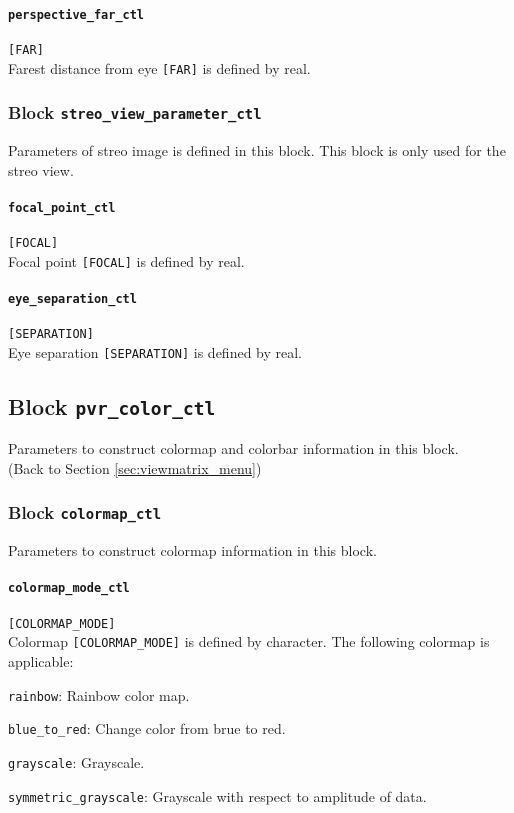 \paragraph{\tt perspective\_far\_ctl}
\label{href_t:perspective_far_ctl}
\verb|[FAR]| \\
Farest distance from eye \verb|[FAR]| is defined by real.


\subsubsection{Block {\tt streo\_view\_parameter\_ctl}}
\label{href_t:streo_view_parameter_ctl}
Parameters of streo image is defined in this block. This block is only used for the streo view.

\paragraph{\tt focal\_point\_ctl}
\label{href_t:focal_point_ctl}
\verb|[FOCAL]| \\
Focal point \verb|[FOCAL]| is defined by real.

\paragraph{\tt eye\_separation\_ctl}
\label{href_t:eye_separation_ctl}
\verb|[SEPARATION]| \\
Eye separation \verb|[SEPARATION]| is defined by real.



\subsection{Block {\tt pvr\_color\_ctl}}
\label{href_t:pvr_color_ctl}
Parameters to construct colormap and colorbar information in this block. \\
(Back to Section \ref{sec:viewmatrix_menu}) \\

\subsubsection{Block {\tt colormap\_ctl}}
\label{href_t:colormap_ctl}
Parameters to construct colormap information in this block. \\

\paragraph{\tt colormap\_mode\_ctl}
\label{href_t:colormap_mode_ctl}
\verb|[COLORMAP_MODE]| \\
Colormap \verb|[COLORMAP_MODE]| is defined by character. The following colormap is applicable:
\begin{description}
\item{{\tt rainbow}: } Rainbow color map.
\item{{\tt blue\_to\_red}: } Change color from brue to red.
\item{{\tt grayscale}: } Grayscale.
\item{{\tt symmetric\_grayscale}: } Grayscale with respect to amplitude of data.
\end{description}


